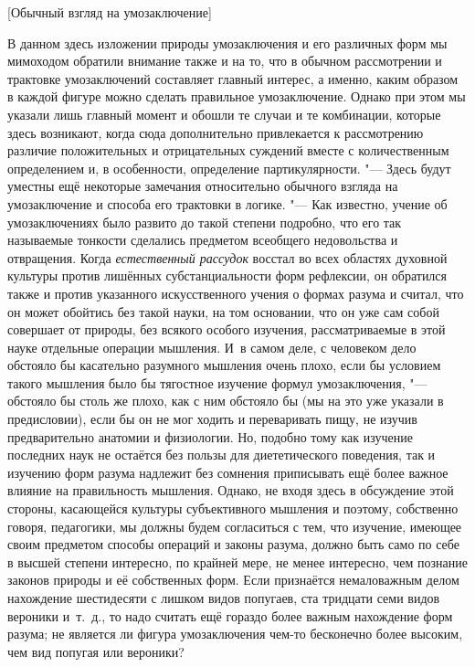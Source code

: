 %
{[Обычный взгляд на умозаключение]}

В данном здесь изложении природы умозаключения и его различных
форм мы мимоходом обратили внимание также и на то, что в обычном
рассмотрении и трактовке умозаключений составляет главный
интерес, а именно, каким образом в каждой фигуре можно сделать правильное
умозаключение. Однако при этом мы указали лишь главный момент и обошли те
случаи и те комбинации, которые здесь возникают, когда сюда дополнительно
привлекается к рассмотрению различие положительных и отрицательных суждений
вместе с количественным определением и, в особенности, определение
партикулярности. "--- Здесь будут уместны ещё некоторые
замечания относительно обычного взгляда на умозаключение и способа его
трактовки в логике. "--- Как известно, учение об умозаключениях
было развито до такой степени подробно, что его так называемые тонкости
сделались предметом всеобщего недовольства и отвращения. Когда
{\em естественный рассудок}
восстал во всех областях духовной культуры против лишённых
субстанциальности форм рефлексии, он обратился также и против указанного
искусственного учения о формах разума и считал, что он может обойтись без
такой науки, на том основании, что он уже сам собой совершает от природы,
без всякого особого изучения, рассматриваемые в этой науке отдельные
операции мышления. И~в самом деле, с человеком дело обстояло бы касательно
разумного мышления очень плохо, если бы условием такого мышления было бы
тягостное изучение формул умозаключения, "--- обстояло бы столь
же плохо, как с ним обстояло бы (мы на это уже указали в
предисловии),
если бы он не мог ходить и переваривать пищу, не изучив
предварительно анатомии и физиологии. Но, подобно тому как изучение
последних наук не остаётся без пользы для диететического поведения, так и
изучению форм разума надлежит без сомнения приписывать ещё более важное
влияние на правильность мышления. Однако, не входя здесь в обсуждение этой
стороны, касающейся культуры субъективного мышления и поэтому, собственно
говоря, педагогики, мы должны будем согласиться с тем, что изучение,
имеющее своим предметом способы операций и законы разума, должно быть само
по себе в высшей степени интересно, по крайней мере, не менее интересно,
чем познание законов природы и её собственных форм. Если признаётся
немаловажным делом нахождение шестидесяти с лишком видов попугаев, ста
тридцати семи видов вероники и~т.~д., то надо считать ещё гораздо более
важным нахождение форм разума; не является ли фигура умозаключения чем-то
бесконечно более высоким, чем вид попугая или вероники?

